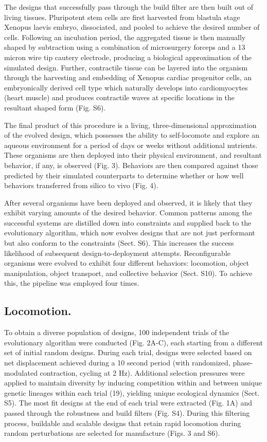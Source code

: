 The designs that successfully pass through the build filter are then built out of living tissues. Pluripotent stem cells are first harvested from blastula stage Xenopus laevis embryo, dissociated, and pooled to achieve the desired number of cells. Following an incubation period, the aggregated tissue is then manually shaped by subtraction using a combination of microsurgery forceps and a 13 micron wire tip cautery electrode, producing a biological approximation of the simulated design. Further, contractile tissue can be layered into the organism through the harvesting and embedding of Xenopus cardiac progenitor cells, an embryonically derived cell type which naturally develops into cardiomyocytes (heart muscle) and produces contractile waves at specific locations in the resultant shaped form (Fig. S6).

The final product of this procedure is a living, three-dimensional approximation of the evolved design, which possesses the ability to self-locomote and explore an aqueous environment for a period of days or weeks without additional nutrients. These organisms are then deployed into their physical environment, and resultant behavior, if any, is observed (Fig. 3). Behaviors are then compared against those predicted by their simulated counterparts to determine whether or how well behaviors transferred from silico to vivo (Fig. 4).

After several organisms have been deployed and observed, it is likely that they exhibit varying amounts of the desired behavior. Common patterns among the successful systems are distilled down into constraints and supplied back to the evolutionary algorithm, which now evolves designs that are not just performant but also conform to the constraints (Sect. S6). This increases the success likelihood of subsequent design-to-deployment attempts.
Reconfigurable organisms were evolved to exhibit four different behaviors: locomotion, object manipulation, object transport, and collective behavior (Sect. S10). To achieve this, the pipeline was employed four times. 

\subsection*{Locomotion.}  

To obtain a diverse population of designs, 100 independent trials of the evolutionary algorithm were conducted (Fig. 2A-C), each starting from a different set of initial random designs. During each trial, designs were selected based on net displacement achieved during a 10 second period (with randomized, phase-modulated contraction, cycling at 2 Hz). Additional selection pressures were applied to maintain diversity by inducing competition within and between unique genetic lineages within each trial (19), yielding unique ecological dynamics (Sect. S5). The most fit designs at the end of each trial were extracted (Fig. 1A) and passed through the robustness and build filters (Fig. S4). During this filtering process, buildable and scalable designs that retain rapid locomotion during random perturbations are selected for manufacture (Figs. 3 and S6). 

